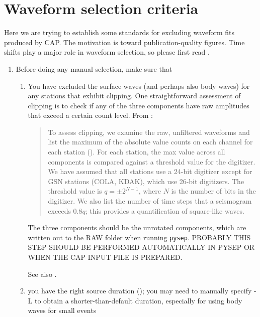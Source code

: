 \section{Waveform selection criteria}

Here we are trying to establish some standards for excluding waveform fits produced by CAP.
The motivation is toward publication-quality figures.
Time shifts play a major role in waveform selection, so please first read .

\begin{enumerate}

\item Before doing any manual selection, make sure that
\begin{enumerate}
\item You have excluded the surface waves (and perhaps also body waves) for any stations that exhibit clipping. One straightforward assessment of clipping is to check if any of the three components have raw amplitudes that exceed a certain count level. From \citet{Tape2017report}:
%
\begin{quote}
To assess clipping, we examine the raw, unfiltered waveforms and list the maximum of the absolute value counts on each channel for each station (\eg {}). For each station, the max value across all components is compared against a threshold value for the digitizer. We have assumed that all stations use a 24-bit digitizer except for GSN stations (COLA, KDAK), which use 26-bit digitizers. The threshold value is $q = \pm 2^{N-1}$, where $N$ is the number of bits in the digitizer. We also list the number of time steps that a seismogram exceeds $0.8 q$; this provides a quantification of square-like waves.
\end{quote}
%
The three components should be the unrotated components, which are written out to the RAW folder when running \verb+pysep+. PROBABLY THIS STEP SHOULD BE PERFORMED AUTOMATICALLY IN PYSEP OR WHEN THE CAP INPUT FILE IS PREPARED.

See also \citet{Tape2016iniskin}.

\label{item:clip}

\item you have the right source duration (); you may need to manually specify -L to obtain a shorter-than-default duration, especially for using body waves for small events



\end{enumerate}
\end{enumerate}

